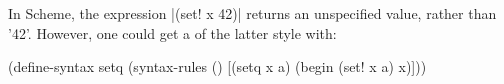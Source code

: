 \documentclass{article}
\begin{document}
In Scheme, the expression
\scheme|(set! x 42)| returns
an unspecified value, rather
than \scheme'42'.  However,
one could get a 
of the latter style with:

\begin{schemedisplay}
(define-syntax setq
  (syntax-rules ()
    [(setq x a)
     (begin (set! x a)
            x)]))
\end{schemedisplay}
\end{document}
